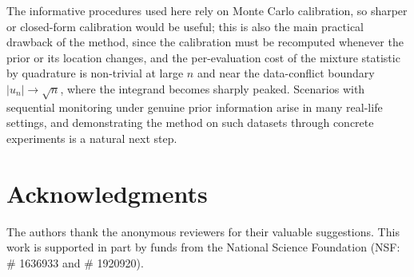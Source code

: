 \documentclass[numsec,webpdf,modern,medium,namedate]{oup-authoring-template}
\theoremstyle{thmstyleone}%
\theoremstyle{thmstyletwo}%
\theoremstyle{thmstylethree}%
\newcommand{\1}{\mathbf{1}}
\begin{document}
The informative procedures used here rely on Monte Carlo calibration, so sharper or closed-form calibration would be useful; this is also
the main practical drawback of the method, since the calibration must be
recomputed whenever the prior or its location changes, and the per-evaluation cost of the mixture statistic by quadrature is non-trivial at large $n$ and near the data-conflict boundary $|u_n| \to \sqrt{n}$, where the integrand becomes sharply peaked. Scenarios with sequential monitoring under genuine prior information arise in
many real-life settings, and demonstrating the method on such datasets through concrete experiments is a natural next step.



\section{Acknowledgments}
The authors thank the anonymous reviewers for their valuable suggestions. This work is supported in part by funds from the National Science Foundation (NSF: \# 1636933 and \# 1920920).




\end{document}
